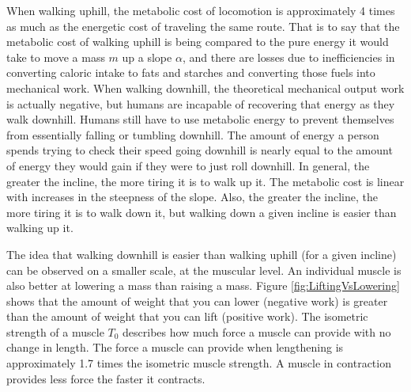 When walking uphill, the metabolic cost of locomotion is approximately 4 times as much as the energetic cost of traveling the same route. That is to say that the metabolic cost of walking uphill is being compared to the pure energy it would take to move a mass $m$ up a slope $\alpha$, and there are losses due to inefficiencies in converting caloric intake to fats and starches and converting those fuels into mechanical work. When walking downhill, the theoretical mechanical output work is actually negative, but humans are incapable of recovering that energy as they walk downhill. Humans still have to use metabolic energy to prevent themselves from essentially falling or tumbling downhill. The amount of energy a person spends trying to check their speed going downhill is nearly equal to the amount of energy they would gain if they were to just roll downhill. In general, the greater the incline, the more tiring it is to walk up it. The metabolic cost is linear with increases in the steepness of the slope. Also, the greater the incline, the more tiring it is to walk down it, but walking down a given incline is easier than walking up it. 


%
%

The idea that walking downhill is easier than walking uphill (for a given incline) can be observed on a smaller scale, at the muscular level. An individual muscle is also better at lowering a mass than raising a mass. Figure \ref{fig:LiftingVsLowering} shows that the amount of weight that you can lower (negative work) is greater than the amount of weight that you can lift (positive work). The isometric strength of a muscle $T_{0}$ describes how much force a muscle can provide with no change in length. The force a muscle can provide when lengthening is approximately 1.7 times the isometric muscle strength. A muscle in contraction provides less force the faster it contracts.

